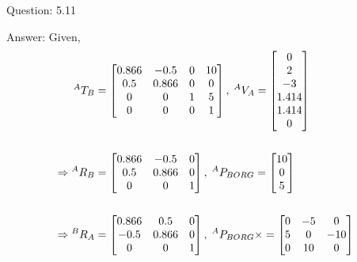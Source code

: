 \documentclass[a4paper]{article}
\begin{document}
\begin{qalist}
		\item[Question: 5.11] \setcounter{equation}{0} %
		\item[Answer:] Given,
			\begin{align} {}^{A}T_{B} &= 
				\begin{bmatrix}0.866 & -0.5 & 0 & 10 \\ 0.5 & 0.866 & 0 & 0 \\ 0 & 0 & 1 & 5 \\ 0 & 0 & 0 & 1\end{bmatrix} ,\; {}^{A}V_{A} = \begin{bmatrix}0 \\ 2 \\ -3 \\ 1.414 \\ 1.414 \\ 0 \end{bmatrix} \\ \notag\\
				\Rightarrow {}^{A}R_{B} &= \begin{bmatrix}0.866 & -0.5 & 0\\ 0.5 & 0.866 & 0\\ 0 & 0 & 1\end{bmatrix} ,\; {}^{A}P_{BORG} = \begin{bmatrix}10\\ 0\\5\end{bmatrix} \\ \notag\\
				\Rightarrow {}^{B}R_{A} &= \begin{bmatrix} 0.866 & 0.5 & 0\\-0.5 & 0.866 & 0 \\ 0 & 0 & 1\end{bmatrix} ,\; {}^{A}P_{BORG}\times = \begin{bmatrix}0 & -5 & 0 \\ 5 & 0 & -10 \\ 0 & 10 & 0\end{bmatrix} \\ \notag\\

\end{align}
\end{qalist}
\end{document}
